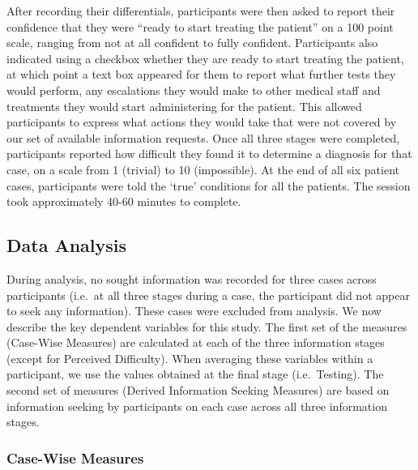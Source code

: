\documentclass[a4paper, nobind]{templates/ociamthesis}
\begin{document}
After recording their differentials, participants were then asked to report their confidence that they were ``ready to start treating the patient'' on a 100 point scale, ranging from not at all confident to fully confident. Participants also indicated using a checkbox whether they are ready to start treating the patient, at which point a text box appeared for them to report what further tests they would perform, any escalations they would make to other medical staff and treatments they would start administering for the patient. This allowed participants to express what actions they would take that were not covered by our set of available information requests. Once all three stages were completed, participants reported how difficult they found it to determine a diagnosis for that case, on a scale from 1 (trivial) to 10 (impossible). At the end of all six patient cases, participants were told the `true' conditions for all the patients. The session took approximately 40-60 minutes to complete.

\subsection*{Data Analysis}\label{data-analysis}

During analysis, no sought information was recorded for three cases across participants (i.e.~at all three stages during a case, the participant did not appear to seek any information). These cases were excluded from analysis. We now describe the key dependent variables for this study. The first set of the measures (Case-Wise Measures) are calculated at each of the three information stages (except for Perceived Difficulty). When averaging these variables within a participant, we use the values obtained at the final stage (i.e.~Testing). The second set of measures (Derived Information Seeking Measures) are based on information seeking by participants on each case across all three information stages.

\subsubsection{Case-Wise Measures}\label{case-wise-measures}
\end{document}
